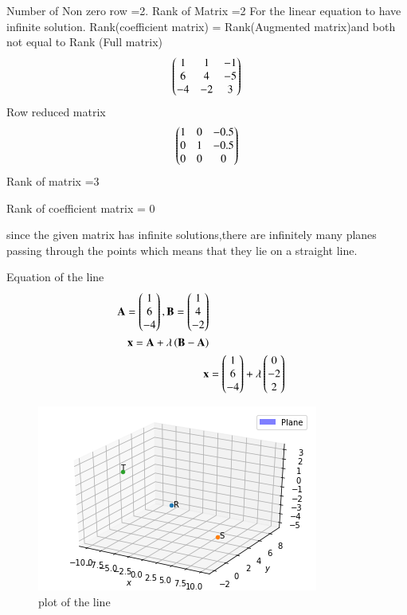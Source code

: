 \documentclass[journal,12pt,twocolumn]{IEEEtran}
\begin{document}
Number of Non zero row =2.
Rank of Matrix =2
For the linear equation to have infinite solution.
Rank(coefficient matrix) = Rank(Augmented matrix)and both not equal to  Rank (Full matrix)
\begin{align}
\begin{pmatrix}1 & 1 & -1\\6 & 4 & -5\\-4 & -2 & 3\end{pmatrix}
\end{align}
Row reduced matrix
\begin{align}
\begin{pmatrix}1 & 0 & -0.5\\0 & 1 & -0.5\\0 & 0 & 0\end{pmatrix}
\end{align}
Rank of matrix =3

Rank of coefficient matrix = 0

since the given matrix has infinite solutions,there are infinitely many planes passing through the points which means that they lie on a straight line.

 Equation of the line
\begin{align}
\mathbf{A} = \begin{pmatrix}1 \\ 6 \\ -4\end{pmatrix} , \mathbf{B} = \begin{pmatrix}1 \\ 4 \\ -2\end{pmatrix}
\\
\mathbf{x} = \mathbf{A}+\lambda\left({\mathbf{B}-\mathbf{A}}\right)
\\
\mathbf{x} &= \begin{pmatrix}1 \\ 6 \\ -4\end{pmatrix}+\lambda\begin{pmatrix}0 \\ -2 \\2\end{pmatrix}
\end{align}
\begin{figure}[ht]
\centering
\includegraphics[width=\columnwidth]{figure.png}
\caption{plot of the line}
\label{Plot of the line}
\end{figure}
\end{document}
